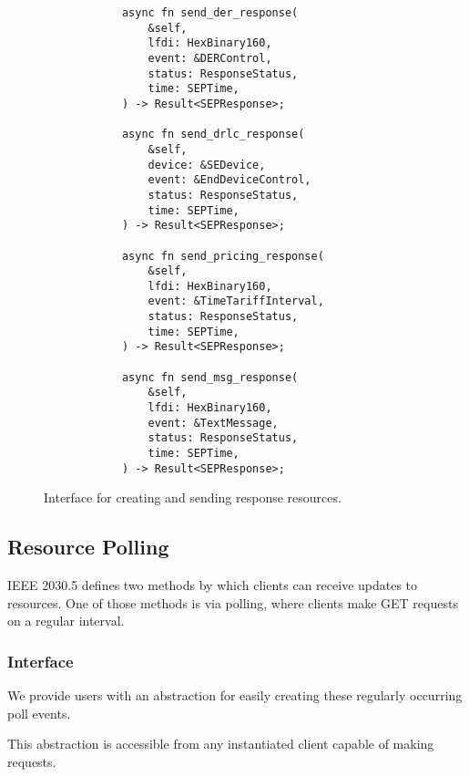 \begin{figure}[h]
    \begin{center}
        \begin{lstlisting}
            async fn send_der_response(
                &self,
                lfdi: HexBinary160,
                event: &DERControl,
                status: ResponseStatus,
                time: SEPTime,
            ) -> Result<SEPResponse>;

            async fn send_drlc_response(
                &self,
                device: &SEDevice,
                event: &EndDeviceControl,
                status: ResponseStatus,
                time: SEPTime,
            ) -> Result<SEPResponse>;

            async fn send_pricing_response(
                &self,
                lfdi: HexBinary160,
                event: &TimeTariffInterval,
                status: ResponseStatus,
                time: SEPTime,
            ) -> Result<SEPResponse>;

            async fn send_msg_response(
                &self,
                lfdi: HexBinary160,
                event: &TextMessage,
                status: ResponseStatus,
                time: SEPTime,
            ) -> Result<SEPResponse>;
        \end{lstlisting}
        \label{fig:sendresponsefunc}
        \vspace{-10pt}
        \caption{Interface for creating and sending response resources.}
    \end{center}
\end{figure}

\subsection{Resource Polling}
IEEE 2030.5 defines two methods by which clients can receive updates to resources. One of those methods is via polling, where clients make GET requests on a regular interval.

\subsubsection{Interface}
We provide users with an abstraction for easily creating these regularly occurring poll events.

This abstraction is accessible from any instantiated client capable of making requests.

